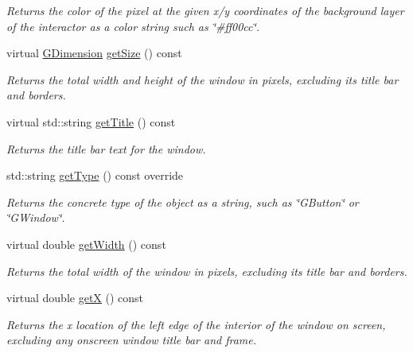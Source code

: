 \begin{DoxyCompactItemize}
\begin{DoxyCompactList}\small\item\em Returns the color of the pixel at the given x/y coordinates of the background layer of the interactor as a color string such as \char`\"{}\#ff00cc\char`\"{}. \end{DoxyCompactList}\item 
virtual \mbox{\hyperlink{structsgl_1_1GDimension}{G\+Dimension}} \mbox{\hyperlink{classsgl_1_1GWindow_a7b4eec96a2bdc6420695d5796a78eea9}{get\+Size}} () const
\begin{DoxyCompactList}\small\item\em Returns the total width and height of the window in pixels, excluding its title bar and borders. \end{DoxyCompactList}\item 
virtual std\+::string \mbox{\hyperlink{classsgl_1_1GWindow_abc7651e67987c4682fed77d92a860bba}{get\+Title}} () const
\begin{DoxyCompactList}\small\item\em Returns the title bar text for the window. \end{DoxyCompactList}\item 
std\+::string \mbox{\hyperlink{classsgl_1_1GWindow_a9b72ede4ee8520f987a0c01e30654814}{get\+Type}} () const override
\begin{DoxyCompactList}\small\item\em Returns the concrete type of the object as a string, such as {\ttfamily \char`\"{}\+G\+Button\char`\"{}} or {\ttfamily \char`\"{}\+G\+Window\char`\"{}}. \end{DoxyCompactList}\item 
virtual double \mbox{\hyperlink{classsgl_1_1GWindow_a0ed2965abd4f5701d2cadf71239faf19}{get\+Width}} () const
\begin{DoxyCompactList}\small\item\em Returns the total width of the window in pixels, excluding its title bar and borders. \end{DoxyCompactList}\item 
virtual double \mbox{\hyperlink{classsgl_1_1GWindow_a344385751bee0720059403940d57a13e}{getX}} () const
\begin{DoxyCompactList}\small\item\em Returns the x location of the left edge of the interior of the window on screen, excluding any onscreen window title bar and frame. \end{DoxyCompactList}\item 

\end{DoxyCompactItemize}
